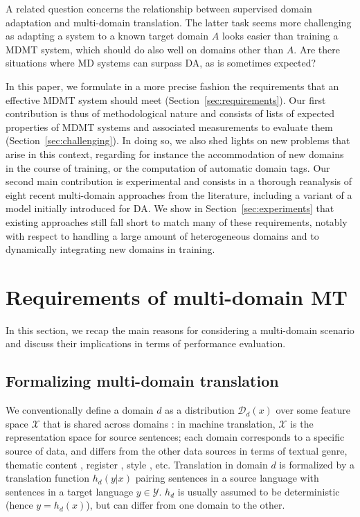 \documentclass[11pt,a4paper]{article}
\newcommand{\fyDone}[1]{\done[FY]\Todo[FY:]{\textcolor{orange}{#1}}}
\begin{document}
A related question concerns the relationship between supervised domain adaptation and multi-domain translation. The latter task seems more challenging as adapting a system to a known target domain $A$ looks easier than training a MDMT system, which should do also well on domains other than $A$. Are there situations where MD systems can surpass DA, as is sometimes expected?
 
In this paper, we formulate in a more precise fashion the requirements that an effective MDMT system should meet (Section~\ref{sec:requirements}). Our first contribution is thus of methodological nature and consists of lists of expected properties of MDMT systems and associated measurements to evaluate them (Section~\ref{sec:challenging}). In doing so, we also shed lights on new problems that arise in this context, regarding for instance the accommodation of new domains in the course of training, or the computation of automatic domain tags.\fyDone{New problems - continuous learning, automatic domains} Our second main contribution is experimental and consists in a thorough reanalysis of eight recent multi-domain approaches from the literature, including a variant of a model initially introduced for DA. We show in Section~\ref{sec:experiments} that existing approaches still fall short to match many of these requirements, notably with respect to handling a large amount of heterogeneous domains and to dynamically integrating new domains in training.\fyDone{Spell out conclusions}
 
\section{Requirements of multi-domain MT \label{sec:requirements}}
In this section, we recap the main reasons for considering a multi-domain scenario and discuss their implications in terms of performance evaluation.
\fyDone{Relation to theory, discussion of worst case scenario}
\fyDone{Insist on the work of Dredze}

\subsection{Formalizing multi-domain translation \label{ssec:formalization}}

We conventionally define a domain $d$ as a distribution $\mathcal{D}_d(x)$ over some feature space $\mathcal{X}$ that is shared across domains \cite{Pan10asurvey}: in machine translation, $\mathcal{X}$ is the representation space for source sentences; each domain corresponds to a specific source of data, and differs from the other data sources in terms of textual genre, thematic content \cite{Chen16guided,Zhang16topicinformed}, register \cite{Sennrich16politeness}, style \cite{Niu18multitask}, etc. Translation in domain $d$ is formalized by a translation function $h_d(y|x)$ pairing sentences in a source language with sentences in a target language $y \in \mathcal{Y}$. $h_d$ is usually assumed to be deterministic (hence $y = h_d(x)$), but can differ from one domain to the other.
\end{document}
